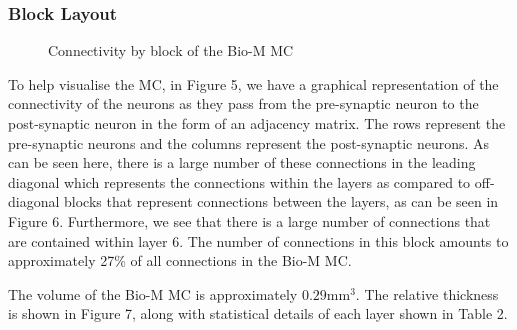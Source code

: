 \subsubsection{Block Layout}
\begin{figure}[H]%
    \centering
    \captionsetup{justification=centering}
    \qquad
    \caption{Connectivity by block of the Bio-M MC}%
    \label{fig:example}%
\end{figure}

To help visualise the MC, in Figure 5, we have a graphical representation of the connectivity of the neurons as they pass from the pre-synaptic neuron to the post-synaptic neuron in the form of an adjacency matrix. The rows represent the pre-synaptic neurons and the columns represent the post-synaptic neurons. As can be seen here, there is a large number of these connections in the leading diagonal which represents the connections within the layers as compared to off-diagonal blocks that represent connections between the layers, as can be seen in Figure 6. Furthermore, we see that there is a large number of connections that are contained within layer 6. The number of connections in this block amounts to approximately 27\% of all connections in the Bio-M MC.

The volume of the Bio-M MC is approximately $0.29$mm$^3$. The relative thickness is shown in Figure 7, along with statistical details of each layer shown in Table 2.


